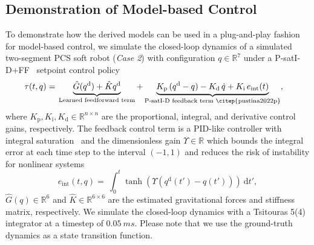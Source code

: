 \subsection{Demonstration of Model-based Control}\label{sub:pcsregression:validation:model_based_control}
To demonstrate how the derived models can be used in a plug-and-play fashion for model-based control, we simulate the closed-loop dynamics of a simulated two-segment \gls{PCS} soft robot (\emph{Case 2}) with configuration $q \in \mathbb{R}^7$ under a P-satI-D+FF~\citep{della2023model, stolzle2024experimental, stolzle2024input} setpoint control policy
\begin{equation}
\begin{split}
    \tau(t, q) =& \: \underbrace{\hat{G}(q^\mathrm{d})+\hat{K}q^\mathrm{d}}_{\text{Learned feedforward term}} + \underbrace{K_\mathrm{p} \, (q^\mathrm{d} - q) - K_\mathrm{d} \, \dot{q} + K_\mathrm{i} \, e_\mathrm{int}(t) }_{\text{P-satI-D feedback term~\citep{pustina2022p}}},
\end{split}
\end{equation}
where $K_\mathrm{p}, K_\mathrm{i}, K_\mathrm{d} \in \mathbb{R}^{n \times n}$ are the proportional, integral, and derivative control gains, respectively.
The feedback control term is a PID-like controller with integral saturation~\citep{pustina2022p} and the dimensionless gain $\Upsilon \in \mathbb{R}$ which bounds the integral error at each time step to the interval $(-1, 1)$ and reduces the risk of instability for nonlinear systems
\begin{equation}
    e_\mathrm{int}(t, q) = \:  \int_0^t \tanh(\Upsilon (q^\mathrm{d}(t') - q(t'))) \: \mathrm{d}t',
\end{equation}
$\hat{G}(q) \in \mathbb{R}^{6}$ and $\hat{K} \in \mathbb{R}^{6 \times 6}$ are the estimated gravitational forces and stiffness matrix, respectively.
We simulate the closed-loop dynamics with a Tsitouras 5(4) integrator at a timestep of $\SI{0.05}{ms}$.
Please note that we use the ground-truth dynamics as a state transition function.

